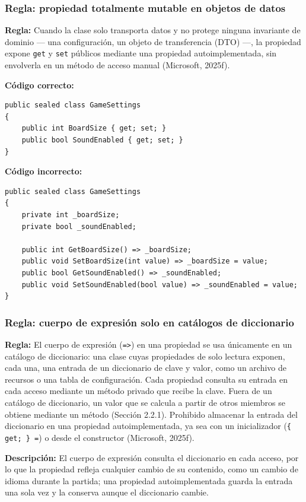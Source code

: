 \subsubsection{Regla: propiedad totalmente mutable en objetos de datos}

\textbf{Regla:} Cuando la clase solo transporta datos y no protege ninguna invariante de dominio --- una configuración, un objeto de transferencia (DTO) ---, la propiedad expone \texttt{get} y \texttt{set} públicos mediante una propiedad autoimplementada, sin envolverla en un método de acceso manual (Microsoft, 2025f).

\textbf{Código correcto:}
\begin{lstlisting}[style=csharpstyle]
public sealed class GameSettings
{
    public int BoardSize { get; set; }
    public bool SoundEnabled { get; set; }
}
\end{lstlisting}

\textbf{Código incorrecto:}
\begin{lstlisting}[style=csharpstyle]
public sealed class GameSettings
{
    private int _boardSize;
    private bool _soundEnabled;

    public int GetBoardSize() => _boardSize;
    public void SetBoardSize(int value) => _boardSize = value;
    public bool GetSoundEnabled() => _soundEnabled;
    public void SetSoundEnabled(bool value) => _soundEnabled = value;
}
\end{lstlisting}

\subsubsection{Regla: cuerpo de expresión solo en catálogos de diccionario}

\textbf{Regla:} El cuerpo de expresión (\texttt{=>}) en una propiedad se usa únicamente en un catálogo de diccionario: una clase cuyas propiedades de solo lectura exponen, cada una, una entrada de un diccionario de clave y valor, como un archivo de recursos o una tabla de configuración. Cada propiedad consulta su entrada en cada acceso mediante un método privado que recibe la clave. Fuera de un catálogo de diccionario, un valor que se calcula a partir de otros miembros se obtiene mediante un método (Sección 2.2.1). Prohibido almacenar la entrada del diccionario en una propiedad autoimplementada, ya sea con un inicializador (\mbox{\texttt{\{ get; \} =}}) o desde el constructor (Microsoft, 2025f).

\textbf{Descripción:} El cuerpo de expresión consulta el diccionario en cada acceso, por lo que la propiedad refleja cualquier cambio de su contenido, como un cambio de idioma durante la partida; una propiedad autoimplementada guarda la entrada una sola vez y la conserva aunque el diccionario cambie.


